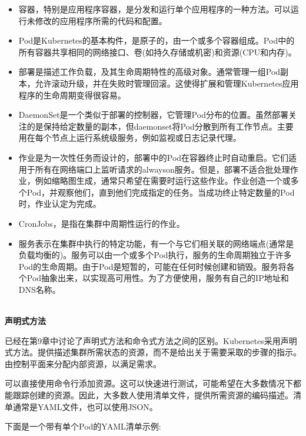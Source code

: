 \begin{itemize}
\item 
容器，特别是应用程序容器，是分发和运行单个应用程序的一种方法。可以运行未修改的应用程序所需的代码和配置。

\item 
Pod是Kubernetes的基本构件，是原子的，由一个或多个容器组成。Pod中的所有容器共享相同的网络接口、卷(如持久存储或机密)和资源(CPU和内存)。

\item 
部署是描述工作负载，及其生命周期特性的高级对象。通常管理一组Pod副本，允许滚动升级，并在失败时管理回滚。这使得扩展和管理Kubernetes应用程序的生命周期变得很容易。

\item 
DaemonSet是一个类似于部署的控制器，它管理Pod分布的位置。虽然部署关注的是保持给定数量的副本，但daemonset将Pod分散到所有工作节点。主要用在每个节点上运行系统级服务，例如监视或日志记录代理。

\item 
作业是为一次性任务而设计的，部署中的Pod在容器终止时自动重启。它们适用于所有在网络端口上监听请求的alwayson服务。但是，部署不适合批处理作业，例如缩略图生成，通常只希望在需要时运行这些作业。作业创造一个或多个Pod，并观察他们，直到他们完成指定的任务。当成功终止特定数量的Pod时，作业认定为完成。

\item 
CronJobs，是指在集群中周期性运行的作业。

\item 
服务表示在集群中执行的特定功能，有一个与它们相关联的网络端点(通常是负载均衡的)。服务可以由一个或多个Pod执行，服务的生命周期独立于许多Pod的生命周期。由于Pod是短暂的，可能在任何时候创建和销毁。服务将各个Pod抽象出来，以实现高可用性。为了方便使用，服务有自己的IP地址和DNS名称。
\end{itemize}

\hspace*{\fill} \\ %
\noindent
\textbf{声明式方法}

已经在第9章中讨论了声明式方法和命令式方法之间的区别。Kubernetes采用声明式方法。提供描述集群所需状态的资源，而不是给出关于需要采取的步骤的指示。由控制平面来分配内部资源，以满足需求。

可以直接使用命令行添加资源。这可以快速进行测试，可能希望在大多数情况下都能跟踪创建的资源。因此，大多数人使用清单文件，提供所需资源的编码描述。清单通常是YAML文件，也可以使用JSON。

下面是一个带有单个Pod的YAML清单示例:

